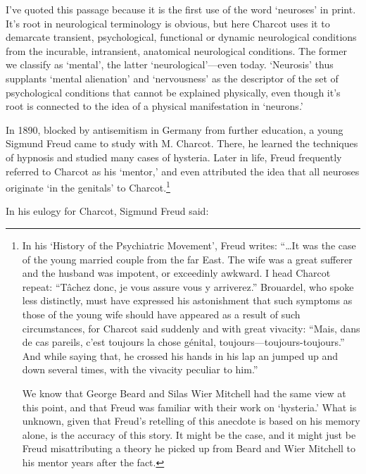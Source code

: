 \begin{refsection}
I've quoted this passage because it is the first use of the word `neuroses' in print. It's root in neurological terminology is obvious, but here Charcot uses it to demarcate transient, psychological, functional or dynamic neurological conditions from the incurable, intransient, anatomical neurological conditions. The former we classify as ‘mental’, the latter ‘neurological’---even today. `Neurosis' thus supplants `mental alienation' and `nervousness' as the descriptor of the set of psychological conditions that cannot be explained physically, even though it’s root is connected to the idea of a physical manifestation in ‘neurons.’

In 1890, blocked by antisemitism in Germany from further education, a young Sigmund Freud came to study with M. Charcot. There, he learned the techniques of hypnosis and studied many cases of hysteria. Later in life, Freud frequently referred to Charcot as his `mentor,' and even attributed the idea that all neuroses originate `in the genitals' to Charcot.\footnote{In his `History of the Psychiatric Movement', Freud writes: “{\ldots}It was the case of the young married couple from the far East. The wife was a great sufferer and the husband was impotent, or exceedinly awkward. I head Charcot repeat: “Tâchez donc, je vous assure vous y arriverez.” Brouardel, who spoke less distinctly, must have expressed his astonishment that such symptoms as those of the young wife should have appeared as a result of such circumstances, for Charcot said suddenly and with great vivacity: “Mais, dans de cas pareils, c'est toujours la chose génital, toujours—toujours-toujours.” And while saying that, he crossed his hands in his lap an jumped up and down several times, with the vivacity peculiar to him.” ~\citep[p. 937--938]{Freud:1938vi}

We know that George Beard and Silas Wier Mitchell had the same view at this point, and that Freud was familiar with their work on ‘hysteria.’ What is unknown, given that Freud's retelling of this anecdote is based on his memory alone, is the accuracy of this story. It might be the case, and it might just be Freud misattributing a theory he picked up from Beard and Wier Mitchell to his mentor years after the fact.}

In his eulogy for Charcot, Sigmund Freud said:

\begin{quote}


\end{quote}
\end{refsection}
